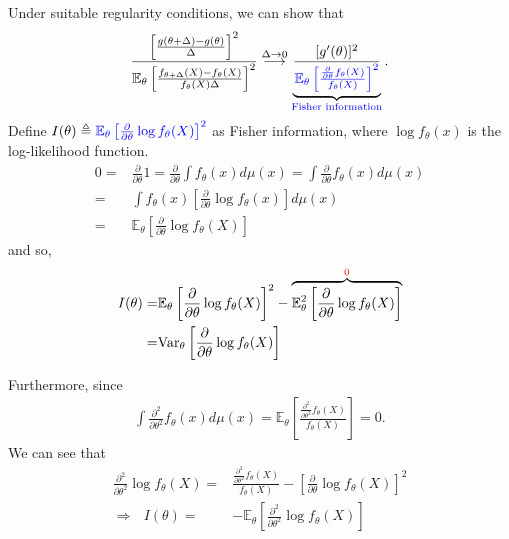 Under suitable regularity conditions, we can show that 
\begin{gather}
    \frac{\left[
        \frac{g(\theta+\Delta)-g(\theta)}
        {\Delta}
    \right]^2}
    {\mathbb{E}_\theta\left[
        \frac{f_{\theta+\Delta}(X)-f_\theta(X)}
        {f_\theta(X)\Delta}
    \right]^2}
    \overset{\Delta\to 0}{\longrightarrow}
    \underbrace{\frac{[g'(\theta)]^2}
    {\color{blue}\mathbb{E}_\theta\left[
        \frac{
            \frac{\partial{}}
            {\partial{\theta}}f_\theta(X)}
        {f_\theta(X)}
    \right]^2}}_{\color{blue}\text{Fisher information}}.
\end{gather}
Define $I(\theta)\triangleq{\color{blue}\mathbb{E}_\theta\left[\frac{\partial}{\partial\theta}\log{f_\theta(X)}\right]^2}$
as Fisher information,
where $\log{f_\theta}(x)$ is the log-likelihood function.
\begin{align}
    0=& \frac{\partial}{\partial\theta}1
    = \frac{\partial}{\partial\theta}\int{f_\theta(x)}d\mu(x)
    = \int{\frac{\partial}{\partial\theta}f_\theta(x)}d\mu(x)\\
    =& \int{f_\theta(x)\left[\frac{\partial}{\partial\theta}\log{f_\theta(x)}\right]}d\mu(x)\\
    =& \mathbb{E}_\theta\left[\frac{\partial}{\partial\theta}\log{f_\theta(X)}\right]
\end{align}
and so,
\begin{align}
    I(\theta)=& \mathbb{E}_\theta\left[\frac{\partial}{\partial\theta}\log{f_\theta(X)}\right]^2
    - \overbrace{\mathbb{E}_\theta^2\left[\frac{\partial}{\partial\theta}\log{f_\theta(X)}\right]}^{\text{\color{red}0}}\\
    =& \mathrm{Var}_\theta\left[\frac{\partial}{\partial\theta}\log{f_\theta(X)}\right]
\end{align}

Furthermore, since 
\begin{gather}
    \int{\frac{\partial^2}{\partial\theta^2}f_\theta(x)}d\mu(x)
    =\mathbb{E}_\theta\left[
        \frac{
        \frac{\partial^2}{\partial\theta^2}f_\theta(X)
        }{f_\theta(X)}
    \right]=0.
\end{gather}
We can see that 
\begin{align}
    \frac{\partial^2}{\partial\theta^2}\log{f_\theta(X)}
    =& \frac{\frac{\partial^2}{\partial\theta^2}f_\theta(X)}{f_\theta(X)}
    - \left[ \frac{\partial}{\partial\theta}\log{f_\theta(X)} \right]^2 \\
    \Rightarrow~~~
    I(\theta)
    =& -\mathbb{E}_\theta \left[ \frac{\partial^2}{\partial\theta^2}\log{f_\theta(X)} \right]
\end{align}

